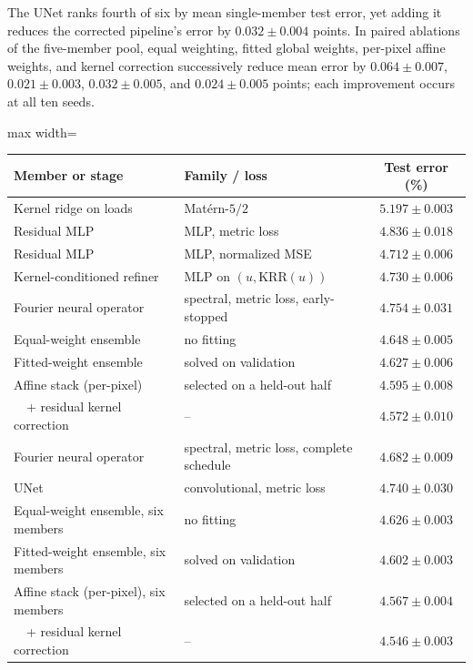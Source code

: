 \documentclass[twoside,11pt]{article}
\newcommand{\errPipe}{4.572}         %
\newcommand{\errPipeSd}{0.010}       %
\newcommand{\errStack}{4.595}        %
\newcommand{\errStackSd}{0.008}
\newcommand{\corrGain}{0.024}        %
\newcommand{\corrGainSd}{0.005}
\newcommand{\errEnsEq}{4.648}        %
\newcommand{\errEnsEqSd}{0.005}
\newcommand{\errEnsFit}{4.627}       %
\newcommand{\errEnsFitSd}{0.006}
\newcommand{\errSix}{4.546}          %
\newcommand{\errSixSd}{0.003}
\newcommand{\errSixStack}{4.567}     %
\newcommand{\errSixStackSd}{0.004}
\newcommand{\errSixGlob}{4.602}      %
\newcommand{\errSixGlobSd}{0.003}
\newcommand{\errSixEq}{4.626}        %
\newcommand{\errSixEqSd}{0.003}
\newcommand{\errFNOc}{4.682}         %
\newcommand{\errFNOcSd}{0.009}
\newcommand{\errUNet}{4.740}         %
\newcommand{\errUNetSd}{0.030}
\newcommand{\unetGain}{0.032}        %
\newcommand{\unetGainSd}{0.004}
\newcommand{\errMLP}{4.836}          %
\newcommand{\errMLPSd}{0.018}
\newcommand{\errMSE}{4.712}          %
\newcommand{\errMSESd}{0.006}
\newcommand{\errRef}{4.730}          %
\newcommand{\errRefSd}{0.006}
\newcommand{\errFNOG}{4.754}         %
\newcommand{\errFNOGSd}{0.031}
\newcommand{\errKRRload}{5.197}      %
\newcommand{\errKRRloadSd}{0.003}
\begin{document}
The UNet ranks fourth of six by mean single-member test error, yet adding it reduces the corrected pipeline's error by $\unetGain\pm\unetGainSd$ points. In paired ablations of the five-member pool, equal weighting, fitted global weights, per-pixel affine weights, and kernel correction successively reduce mean error by $0.064\pm0.007$, $0.021\pm0.003$, $0.032\pm0.005$, and $\corrGain\pm\corrGainSd$ points; each improvement occurs at all ten seeds.

\begin{table}[t]
\centering

\begin{adjustbox}{max width=\linewidth}
\begin{tabular}{llc}
\toprule
Member or stage & Family / loss & Test error (\%) \\
\midrule
Kernel ridge on loads & Mat\'ern-$5/2$ & $\errKRRload\pm\errKRRloadSd$ \\
Residual MLP & MLP, metric loss & $\errMLP\pm\errMLPSd$ \\
Residual MLP & MLP, normalized MSE & $\errMSE\pm\errMSESd$ \\
Kernel-conditioned refiner & MLP on $(u,\mathrm{KRR}(u))$ & $\errRef\pm\errRefSd$ \\
Fourier neural operator & spectral, metric loss, early-stopped & $\errFNOG\pm\errFNOGSd$ \\
\midrule
Equal-weight ensemble & no fitting & $\errEnsEq\pm\errEnsEqSd$ \\
Fitted-weight ensemble & solved on validation & $\errEnsFit\pm\errEnsFitSd$ \\
Affine stack (per-pixel) & selected on a held-out half & $\errStack\pm\errStackSd$ \\
\ \ + residual kernel correction & -- & $\errPipe\pm\errPipeSd$ \\
\midrule
Fourier neural operator & spectral, metric loss, complete schedule & $\errFNOc\pm\errFNOcSd$ \\
UNet & convolutional, metric loss & $\errUNet\pm\errUNetSd$ \\
Equal-weight ensemble, six members & no fitting & $\errSixEq\pm\errSixEqSd$ \\
Fitted-weight ensemble, six members & solved on validation & $\errSixGlob\pm\errSixGlobSd$ \\
Affine stack (per-pixel), six members & selected on a held-out half & $\errSixStack\pm\errSixStackSd$ \\
\ \ + residual kernel correction & -- & $\errSix\pm\errSixSd$ \\

\end{tabular}
\end{adjustbox}
\end{table}
\end{document}
